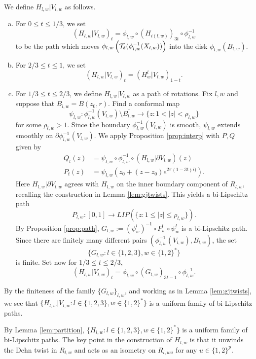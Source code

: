 \documentclass{amsart}
\begin{document}
We define $H_{l,w}|V_{l,w}$ as follows.
\begin{enumerate}[(a)]
\item For $0\leq t\leq 1/3$, we set 
\[ (H_{l,w}|V_{l,w})_t = \phi_{l,w}\circ (H_{i(l,w)})_{3t} \circ \phi^{-1}_{l,w}\] 
to be the path which moves $\phi_{l,w}\left(\mathcal{T}_{\delta}(\phi^{-1}_{l,w}(X_{l,w}))\right)$ into the disk $\phi_{l,w}(B_{l,w})$.
\item For $2/3 \leq t \leq 1$, we set 
\[ (H_{l,w}|V_{l,w})_t = (H^l_w|V_{l,w})_{1-t}.\]
\item For $1/3 \leq t \leq 2/3$, we define $H_{l,w}|V_{l,w}$ as a path of rotations. Fix $l,w$ and suppose that $B_{l,w} = B(z_0,r)$. 
Find a conformal map 
\[ \psi_{l,w} : \phi^{-1}_{l,w}(V_{l,w}) \setminus \overline{ B_{l,w}} \to \{z : 1 < |z| < \rho_{l,w} \}\] 
for some $\rho_{l,w} >1$. Since the boundary $\phi^{-1}_{l,w}(V_{l,w})$ is smooth, $\psi_{l,w}$ extends smoothly on $\partial \phi^{-1}_{l,w}(V_{l,w})$. We apply Proposition \ref{prop:interp} with $P,Q$ given by
\begin{align*}
Q_t(z) &= \psi_{l,w}\circ \phi^{-1}_{l,w}\circ (H_{l,w}|\partial V_{l,w})(z)\\
P_t(z) &= \psi_{l,w}(z_0 + (z-z_0)e^{2\pi  (1-3t)i)}).
\end{align*}
Here $H_{l,w}|\partial V_{l,w}$ agrees with $H_{l,w}$ on the inner boundary component of $R_{l,w}$, recalling the construction in Lemma \ref{lem:gjtwists}.
This yields a bi-Lipschitz path 
\[P_{l,w}:[0,1] \to LIP(\{z : 1 \leq  |z| \leq \rho_{l,w} \}).\] 
By Proposition \ref{prop:path}, $G_{l,w} := (\psi^l_w)^{-1} \circ P^l_w \circ \psi^l_w$ is a bi-Lipschitz path. Since there are finitely many different pairs $(\phi^{-1}_{l,w}(V_{l,w}), B_{l,w})$, the set 
\[ \{G_{l,w} : l\in\{1,2,3\},w\in\{1,2\}^*\}\] 
is finite. Set now for $1/3 \leq t \leq 2/3$,
\[ (H_{l,w}|V_{l,w})_{t} = \phi_{l,w} \circ (G_{l,w})_{3t-1}\circ \phi^{-1}_{l,w}.\]
\end{enumerate}

By the finiteness of the family $\{G_{l,w}\}_{l,w}$, and working as in Lemma \ref{lem:gjtwists}, we see that $\{H_{l,w}|V_{l,w} : l\in\{1,2,3\},w\in\{1,2\}^*\}$ is a uniform family of bi-Lipschitz paths. 

By Lemma \ref{lem:partition}, $\{H_{l,w} : l\in\{1,2,3\},w\in\{1,2\}^*\}$ is a uniform family of bi-Lipschitz paths.
The key point in the construction of $H_{l,w}$ is that it unwinds the Dehn twist in $R_{l,w}$ and acts as an isometry on $R_{l,{wu}}$ for any $u\in \{1,2\}^p$.
\end{document}
